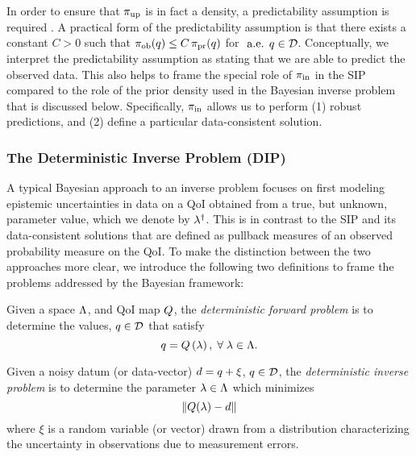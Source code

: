 In order to ensure that $\operatorname*{\pi_{up}}$ is in fact a density, a predictability assumption is required \cite{BJW18a}.
A practical form of the predictability assumption is that there exists a constant $C>0$ such that $\operatorname*{\pi_{ob}}(q)\leq C\operatorname*{\pi_{pr}}(q)$ for $\text{ a.e. } q\in\mathcal{D}$.
Conceptually, we interpret the predictability assumption as stating that we are able to predict the observed data.
This also helps to frame the special role of $\operatorname*{\pi_{in}}$ in the SIP compared to the role of the prior density used in the Bayesian inverse problem that is discussed below.
Specifically, $\operatorname*{\pi_{in}}$ allows us to perform (1) robust predictions, and (2) define a particular data-consistent solution.




\subsubsection{The Deterministic Inverse Problem (DIP)}
A typical Bayesian approach to an inverse problem focuses on first modeling epistemic uncertainties in data on a QoI obtained from a true, but unknown, parameter value, which we denote by $\lambda^\dagger$.
This is in contrast to the SIP and its data-consistent solutions that are defined as pullback measures of an observed probability measure on the QoI.
To make the distinction between the two approaches more clear, we introduce the following two definitions to frame the problems addressed by the Bayesian framework:


\begin{defn}
  Given a space ${\Lambda}$, and QoI map $Q$, the \emph{deterministic forward problem} is to determine the values, $q \in \mathcal{D}$ that satisfy
  \begin{equation}
    q = Q\left ( \lambda \right ), \; \forall \; \lambda \in {\Lambda}.
  \end{equation}
\end{defn}

\begin{defn}
  Given a noisy datum (or data-vector) $d = q + \xi$, $q \in \mathcal{D}$, the \emph{deterministic inverse problem} is to determine the parameter $\lambda \in {\Lambda}$ which minimizes
  \begin{equation}
    \left\Vert Q(\lambda) - d\right\Vert
  \end{equation}
  where $\xi$ is a random variable (or vector) drawn from a distribution characterizing the uncertainty in observations due to measurement errors.
\end{defn}

